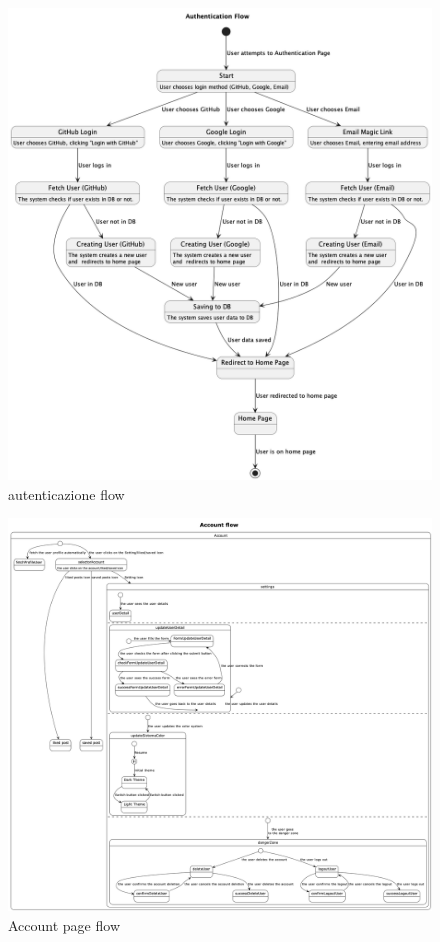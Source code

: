 \documentclass{article}
\begin{document}
\begin{figure}[h]
    \lefting
    \includegraphics[width=1.3\textwidth]{authentication_flow}
    \caption{autenticazione flow}
\end{figure}

\begin{figure}[h]
    \lefting
    \includegraphics[width=1.3\textwidth]{account_page_flow}
    \caption{Account page flow}
\end{figure}
\end{document}
